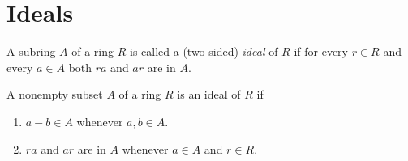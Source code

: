 \section{Ideals}

\begin{definition}[Ideal]
	A subring $A$ of a ring $R$ is called a (two-sided) \textit{ideal} of $R$ if for every $r \in R$ and every $a \in A$ both $ra$ and $ar$ are in $A$.
\end{definition}

\begin{theorem}
	A nonempty subset $A$ of a ring $R$ is an ideal of $R$ if
	\begin{enumerate}
		\item $a-b \in A$ whenever $a,b \in A$.
		\item $ra$ and $ar$ are in $A$ whenever $a \in A$ and $r \in R$.
	\end{enumerate}
\end{theorem}
